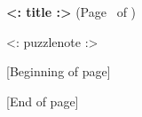 % 

\geometry{headheight=50pt}
\usepackage{fancyhdr}
\pagestyle{fancy}
\fancyhead{}
\fancyfoot{}
\renewcommand{\headrulewidth}{0pt}
\renewcommand{\footrulewidth}{0pt}
\usepackage{lastpage}




\begin{center}
  \textbf{<: title :>} (Page \thepage\ of \pageref{LastPage})

  \medskip

  <: puzzlenote :>

  \bigskip

  [Beginning of page]


  [End of page]

\end{center}



